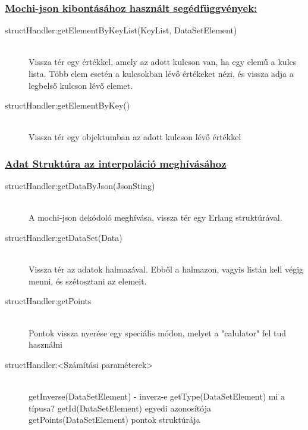 	\subsubsection{\underline{
		Mochi-json kibontásához használt segédfüggvények:
	}}
	\begin{description}
		\item[structHandler:getElementByKeyList(KeyList, DataSetElement)] \hfill \\ 
		Vissza tér egy értékkel, amely az adott kulcson van, ha egy elemű a kulcs lista. Több elem esetén a kulcsokban lévő értékeket nézi, és vissza adja a legbelső kulcson lévő elemet.

		\item[structHandler:getElementByKey()] \hfill \\ 
		Vissza tér egy objektumban az adott kulcson lévő értékkel
	\end{description}
	\subsubsection{\underline{Adat Struktúra az interpoláció meghívásához}}
	\begin{description}

		\item[structHandler:getDataByJson(JsonSting)] \hfill \\
		A mochi-json dekódoló meghívása, vissza tér egy Erlang struktúrával.
		
		\item[structHandler:getDataSet(Data)]\hfill \\ 
		Vissza tér az adatok halmazával. Ebből a halmazon, vagyis listán kell végig menni, és szétosztani az elemeit. 
		
		\item[structHandler:getPoints] \hfill \\
		Pontok vissza nyerése egy speciális módon, melyet a "calulator" fel tud használni

		

		\item[structHandler:<Számítási paraméterek>] \hfill \\ 
		getInverse(DataSetElement) - inverz-e \newline
		getType(DataSetElement) mi a típusa? \newline
		getId(DataSetElement) egyedi azonosítója \newline
		getPoints(DataSetElement) pontok struktúrája
	\end{description}
